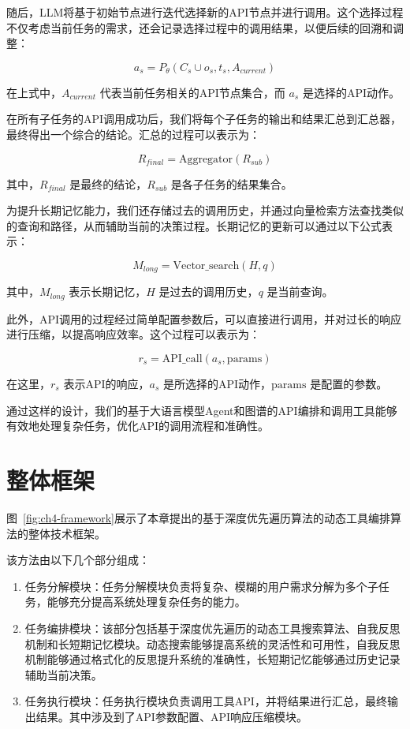 随后，LLM将基于初始节点进行迭代选择新的API节点并进行调用。这个选择过程不仅考虑当前任务的需求，还会记录选择过程中的调用结果，以便后续的回溯和调整：

\[
a_s = P_\theta(C_s \cup o_s, t_s, A_{current}) \tag{3}
\]

在上式中，\( A_{current} \) 代表当前任务相关的API节点集合，而 \( a_s \) 是选择的API动作。

在所有子任务的API调用成功后，我们将每个子任务的输出和结果汇总到汇总器，最终得出一个综合的结论。汇总的过程可以表示为：

\[
R_{final} = \text{Aggregator}(R_{sub}) \tag{4}
\]

其中，\( R_{final} \) 是最终的结论，\( R_{sub} \) 是各子任务的结果集合。

为提升长期记忆能力，我们还存储过去的调用历史，并通过向量检索方法查找类似的查询和路径，从而辅助当前的决策过程。长期记忆的更新可以通过以下公式表示：

\[
M_{long} = \text{Vector\_search}(H, q) \tag{5}
\]

其中，\( M_{long} \) 表示长期记忆，\( H \) 是过去的调用历史，\( q \) 是当前查询。

此外，API调用的过程经过简单配置参数后，可以直接进行调用，并对过长的响应进行压缩，以提高响应效率。这个过程可以表示为：

\[
r_s = \text{API\_call}(a_s, \text{params}) \tag{6}
\]

在这里，\( r_s \) 表示API的响应，\( a_s \) 是所选择的API动作，\(\text{params}\) 是配置的参数。

通过这样的设计，我们的基于大语言模型Agent和图谱的API编排和调用工具能够有效地处理复杂任务，优化API的调用流程和准确性。

\section{整体框架}

图~\ref{fig:ch4-framework}展示了本章提出的基于深度优先遍历算法的动态工具编排算法的整体技术框架。

该方法由以下几个部分组成：

\begin{enumerate}
  \item 任务分解模块：任务分解模块负责将复杂、模糊的用户需求分解为多个子任务，能够充分提高系统处理复杂任务的能力。
  \item 任务编排模块：该部分包括基于深度优先遍历的动态工具搜索算法、自我反思机制和长短期记忆模块。动态搜索能够提高系统的灵活性和可用性，自我反思机制能够通过格式化的反思提升系统的准确性，长短期记忆能够通过历史记录辅助当前决策。
  \item 任务执行模块：任务执行模块负责调用工具API，并将结果进行汇总，最终输出结果。其中涉及到了API参数配置、API响应压缩模块。
\end{enumerate}


